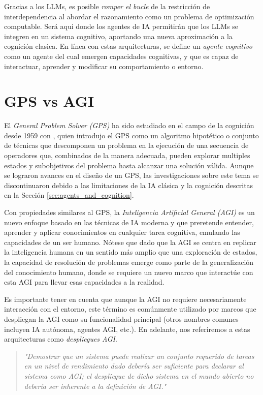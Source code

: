 Gracias a los LLMs, es posible \emph{romper el bucle} de la restricción de
interdependencia al abordar el razonamiento como un problema de optimización
computable. Será aqui donde los agentes de IA permitirán que los LLMs se
integren en un sistema cognitivo, aportando una nueva aproximación a la cognición clasica.
En línea con estas arquitecturas, se define un \emph{agente cognitivo} como un
agente del cual emergen capacidades cognitivas, y que es capaz de interactuar,
aprender y modificar su comportamiento o entorno.


\section{GPS vs AGI}

El \emph{General Problem Solver (GPS)} ha sido estudiado en el campo de la
cognición desde 1959 con \citet{newell1959report}, quien introdujo el GPS como
un algoritmo hipotético o conjunto de técnicas que descomponen un problema en la
ejecución de una secuencia de operadores que, combinados de la manera adecuada,
pueden explorar multiples estados y subobjetivos del problema hasta alcanzar una
solución válida. Aunque se lograron avances en el diseño de un GPS, las
investigaciones sobre este tema se discontinuaron debido a las limitaciones de
la IA clásica y la cognición descritas en la Sección
\ref{sec:agents_and_cognition}.

Con propiedades similares al GPS, la \emph{Inteligencia Artificial General
(AGI)} es un nuevo enfoque basado en las técnicas de IA moderna y que preretende
entender, aprender y aplicar conocimientos en cualquier tarea cognitiva,
emulando las capacidades de un ser humano. Nótese que dado que la AGI se centra en
replicar la inteligencia humana en un sentido más amplio que una exploración de
estados, la capacidad de resolución de problemas emerge como parte de la
generalización del conocimiento humano, donde se requiere un nuevo marco que
interactúe con esta AGI para llevar esas capacidades a la realidad.

Es importante tener en cuenta que aunque la AGI no requiere necesariamente
interacción con el entorno, este término es comúnmente utilizado por marcos que
despliegan la AGI como su funcionalidad principal (otros nombres comunes
incluyen IA autónoma, agentes AGI, etc.). En adelante, nos referiremos a estas
arquitecturas como \emph{despliegues AGI}.

\begin{quote} \small\textit{
    "Demostrar que un sistema puede realizar un conjunto requerido de tareas en
    un nivel de rendimiento dado debería ser suficiente para declarar al sistema
    como AGI; el despliegue de dicho sistema en el mundo abierto no debería ser
    inherente a la definición de AGI."
\citet{morris2023levels} } \end{quote}

